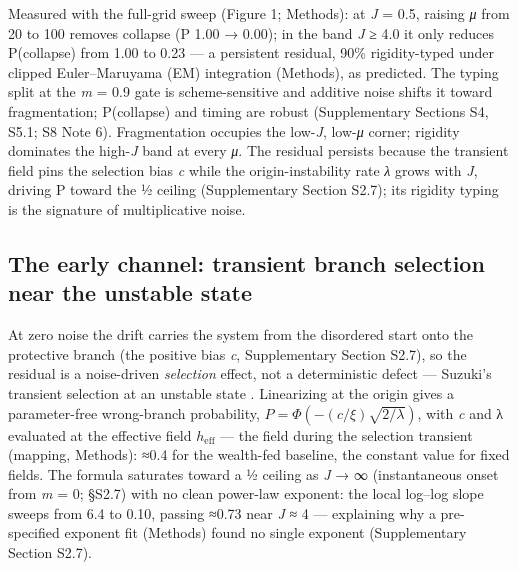 \documentclass[11pt,letterpaper]{article}
\begin{document}
Measured with the full-grid sweep (Figure 1; Methods): at \emph{J} = 0.5, raising \emph{μ} from 20 to 100 removes collapse (P 1.00 → 0.00); in the band \emph{J} ≥ 4.0 it only reduces P(collapse) from 1.00 to 0.23 --- a persistent residual, 90\% rigidity-typed under clipped Euler--Maruyama (EM) integration (Methods), as predicted. The typing split at the \textbar{}\emph{m}\textbar{} = 0.9 gate is scheme-sensitive and additive noise shifts it toward fragmentation; P(collapse) and timing are robust (Supplementary Sections S4, S5.1; S8 Note 6). Fragmentation occupies the low-\emph{J}, low-\emph{μ} corner; rigidity dominates the high-\emph{J} band at every \emph{μ}. The residual persists because the transient field pins the selection bias \emph{c} while the origin-instability rate \emph{λ} grows with \emph{J}, driving P toward the ½ ceiling (Supplementary Section S2.7); its rigidity typing is the signature of multiplicative noise.

\subsection{The early channel: transient branch selection near the unstable state}\label{the-early-channel-transient-branch-selection-near-the-unstable-state}

At zero noise the drift carries the system from the disordered start onto the protective branch (the positive bias \emph{c}, Supplementary Section S2.7), so the residual is a noise-driven \emph{selection} effect, not a deterministic defect --- Suzuki's transient selection at an unstable state \cite{suzuki1977,tarliemckane1998,mckanetarlie2001,mckanetarlie2004}. Linearizing at the origin gives a parameter-free wrong-branch probability, \(P = \Phi\!\left(-(c/\xi)\sqrt{2/\lambda}\right)\), with \emph{c} and λ evaluated at the effective field \(h_{\mathrm{eff}}\) --- the field during the selection transient (mapping, Methods): ≈0.4 for the wealth-fed baseline, the constant value for fixed fields. The formula saturates toward a ½ ceiling as \emph{J} → ∞ (instantaneous onset from \emph{m} = 0; §S2.7) with no clean power-law exponent: the local log--log slope sweeps from 6.4 to 0.10, passing ≈0.73 near \emph{J} ≈ 4 --- explaining why a pre-specified exponent fit (Methods) found no single exponent (Supplementary Section S2.7).
\end{document}
